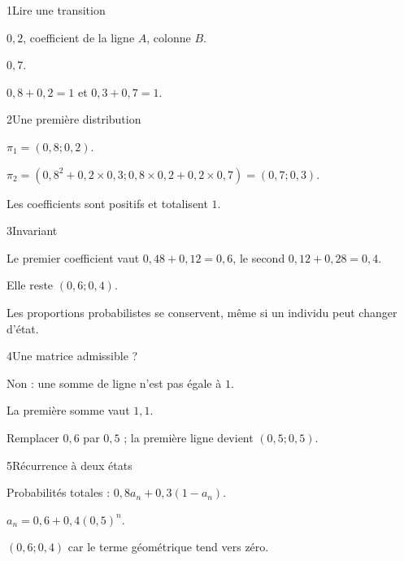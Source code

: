 \begin{corrige}{1}{Lire une transition}
\begin{questions}
\item $0{,}2$, coefficient de la ligne $A$, colonne $B$.
\item $0{,}7$.
\item $0{,}8+0{,}2=1$ et $0{,}3+0{,}7=1$.
\end{questions}
\end{corrige}
\begin{corrige}{2}{Une première distribution}
\begin{questions}
\item $\pi_1=(0{,}8;0{,}2)$.
\item $\pi_2=(0{,}8^2+0{,}2\times0{,}3;0{,}8\times0{,}2+0{,}2\times0{,}7)=(0{,}7;0{,}3)$.
\item Les coefficients sont positifs et totalisent $1$.
\end{questions}
\end{corrige}
\begin{corrige}{3}{Invariant}
\begin{questions}
\item Le premier coefficient vaut $0{,}48+0{,}12=0{,}6$, le second $0{,}12+0{,}28=0{,}4$.
\item Elle reste $(0{,}6;0{,}4)$.
\item Les proportions probabilistes se conservent, même si un individu peut changer d’état.
\end{questions}
\end{corrige}
\begin{corrige}{4}{Une matrice admissible ?}
\begin{questions}
\item Non : une somme de ligne n’est pas égale à $1$.
\item La première somme vaut $1{,}1$.
\item Remplacer $0{,}6$ par $0{,}5$ ; la première ligne devient $(0{,}5;0{,}5)$.
\end{questions}
\end{corrige}
\begin{corrige}{5}{Récurrence à deux états}
\begin{questions}
\item Probabilités totales : $0{,}8a_n+0{,}3(1-a_n)$.
\item $a_n=0{,}6+0{,}4(0{,}5)^n$.
\item $(0{,}6;0{,}4)$ car le terme géométrique tend vers zéro.
\end{questions}
\end{corrige}
